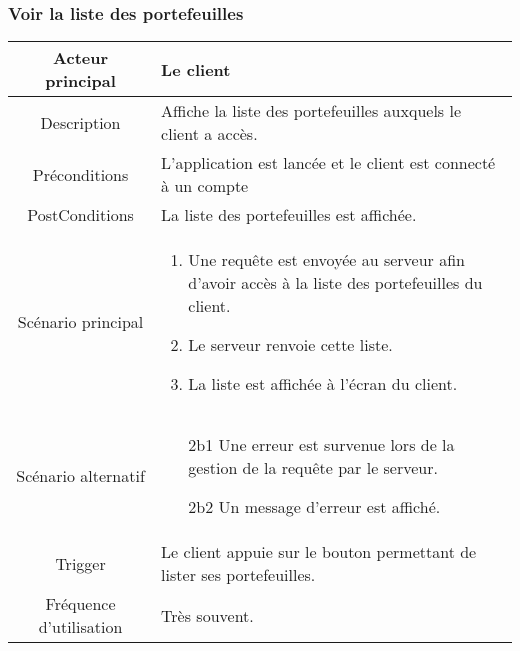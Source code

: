 \documentclass{article}
\begin{document}
\subsubsection{Voir la liste des portefeuilles}
\begin{table}[h]
      \begin{tabular}{|c|p{10cm}|}
         \hline
         Acteur principal&Le client\\
         \hline
         Description&Affiche la liste des portefeuilles auxquels le client a accès.\\
         \hline
         Préconditions&L'application est lancée et le client est connecté à un compte \\
         \hline
         PostConditions&La liste des portefeuilles est affichée.\\
         \hline
         Scénario principal& 
               \begin{enumerate}
                  \item Une requête est envoyée au serveur afin d'avoir accès à la liste des portefeuilles du client.
                  \item Le serveur renvoie cette liste.
                  \item La liste est affichée à l'écran du client.
               \end{enumerate}     \\
         \hline
         Scénario alternatif&
               \begin{itemize}
                  \item[2b1] Une erreur est survenue lors de la gestion de la requête par le serveur.
                  \item[2b2] Un message d'erreur est affiché. 
               \end{itemize}\\
         \hline
         Trigger&Le client appuie sur le bouton permettant de lister ses portefeuilles.\\
         \hline
         Fréquence d'utilisation&Très souvent.\\
         \hline
      \end{tabular}
\end{table}

\newpage
\end{document}
